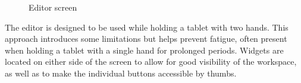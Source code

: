 \begin{figure}
    \centering
    
    
    
    \caption{Editor screen}
    \label{fig:EditorMenus}
\end{figure}

The editor is designed to be used while holding a tablet with two hands. This approach introduces some limitations but helps prevent fatigue, often present when holding a tablet with a single hand for prolonged periods. Widgets are located on either side of the screen to allow for good visibility of the workspace, as well as to make the individual buttons accessible by thumbs.  

